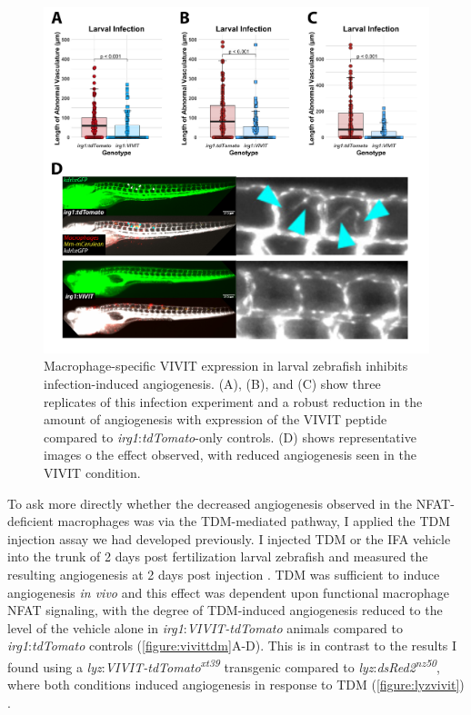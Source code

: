 \begin{figure}
\centering
\includegraphics[width=\textwidth]{images/vivitlinf.pdf}
\caption[\textit{irg1}:\textit{VIVIT-tdTomato} inhibits angiogenesis during infection]{Macrophage\hyp{}specific VIVIT expression in larval zebrafish inhibits infection\hyp{}induced angiogenesis. (A), (B), and (C) show three replicates of this infection experiment and a robust reduction in the amount of angiogenesis with expression of the VIVIT peptide compared to \textit{irg1}:\textit{tdTomato}\hyp{}only controls. (D) shows representative images o the effect observed, with reduced angiogenesis seen in the VIVIT condition.}
\label{figure:vivitinf}
\end{figure}

To ask more directly whether the decreased angiogenesis observed in the NFAT\hyp{}deficient macrophages was via the TDM\hyp{}mediated pathway, I applied the TDM injection assay we had developed previously. I injected TDM or the IFA vehicle into the trunk of 2 days post fertilization larval zebrafish and measured the resulting angiogenesis at 2 days post injection \citep{Walton2018}. TDM was sufficient to induce angiogenesis \textit{in vivo} and this effect was dependent upon functional macrophage NFAT signaling, with the degree of TDM\hyp{}induced angiogenesis reduced to the level of the vehicle alone in \textit{irg1}:\textit{VIVIT\hyp{}tdTomato} animals compared to \textit{irg1}:\textit{tdTomato} controls (\autoref{figure:vivittdm}A\hyp{}D). This is in contrast to the results I found using a \textit{lyz}:\textit{VIVIT\hyp{}tdTomato\textsuperscript{xt39}} transgenic compared to \textit{lyz}:\textit{dsRed2\textsuperscript{nz50}}, where both conditions induced angiogenesis in response to TDM (\autoref{figure:lyzvivit}) \citep{Hall2007}.

